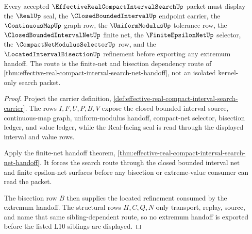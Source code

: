 \begin{theorem}
\label{thm:effective-real-compact-interval-search-l10-sibling-dependency}
Every accepted $\EffectiveRealCompactIntervalSearchUp$ packet must display the $\RealUp$ seal, the $\ClosedBoundedIntervalUp$ endpoint carrier, the $\ContinuousMapUp$ graph row, the $\UniformModulusUp$ tolerance row, the $\ClosedBoundedIntervalNetUp$ finite net, the $\FiniteEpsilonNetUp$ selector, the $\CompactNetModulusSelectorUp$ row, and the $\LocatedIntervalBisectionUp$ refinement before exporting any extremum handoff. The route is the finite-net and bisection dependency route of \autoref{thm:effective-real-compact-interval-search-net-handoff}, not an isolated kernel-only search packet.
\end{theorem}
\begin{proof}
Project the carrier definition, \autoref{def:effective-real-compact-interval-search-carrier}. The rows $I,F,U,P,B,V$ expose the closed bounded interval source, continuous-map graph, uniform-modulus handoff, compact-net selector, bisection ledger, and value ledger, while the Real-facing seal is read through the displayed interval and value rows.

Apply the finite-net handoff theorem, \autoref{thm:effective-real-compact-interval-search-net-handoff}. It forces the search route through the closed bounded interval net and finite epsilon-net surfaces before any bisection or extreme-value consumer can read the packet.

The bisection row $B$ then supplies the located refinement consumed by the extremum handoff. The structural rows $H,C,Q,N$ only transport, replay, source, and name that same sibling-dependent route, so no extremum handoff is exported before the listed L10 siblings are displayed.
\end{proof}

